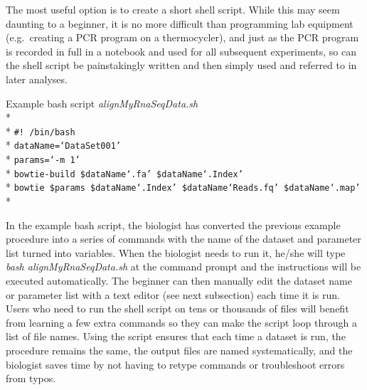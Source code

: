 \documentclass[ChapterTOCs,krantz2]{krantz} %
\begin{document}
The most useful option is to create a short shell script.  While this may seem
daunting to a beginner, it is no more difficult than programming lab
equipment (e.g.\ creating a PCR program on a thermocycler), and just as the PCR
program is recorded in full in a notebook and used for all subsequent
experiments, so can the shell script be painstakingly written and then simply
used and referred to in later analyses.  


Example bash script \emph{alignMyRnaSeqData.sh}\\* \\*
\texttt{\#! /bin/bash}\\*
\texttt{dataName=`DataSet001'}\\*
\texttt{params=`-m 1'}\\*
\texttt{bowtie-build \$dataName`.fa' \$dataName`.Index'}\\*
\texttt{bowtie \$params \$dataName`.Index' \$dataName`Reads.fq' \$dataName`.map' }\\*

In the example bash script, the biologist has converted the
previous example procedure into a series of commands with the name of the
dataset and parameter list turned into variables.  When the biologist needs
to run it, he/she will type \emph{bash alignMyRnaSeqData.sh} at the command prompt and
the instructions will be executed automatically.  The beginner can then
manually edit the dataset name or parameter list with a text editor (see next
subsection) each time it is run.  Users who
need to run the shell script on tens or thousands of files
will benefit from learning a few extra commands so they can make the script
loop through a list of file names.  Using the script ensures that each time a
dataset is run, the procedure remains the same, the output files are named
systematically, and the biologist saves time by not having to retype commands
or troubleshoot errors from typos.
\end{document}
